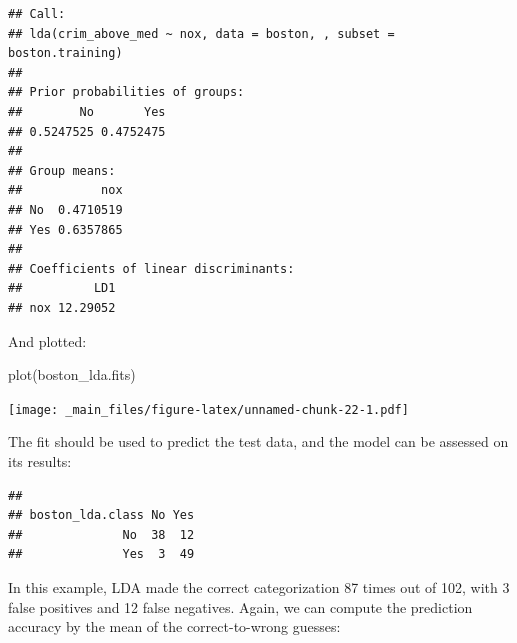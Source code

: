\documentclass[
]{book}
\newenvironment{Shaded}{\begin{snugshade}}{\end{snugshade}}
\newcommand{\FunctionTok}[1]{\textcolor[rgb]{0.00,0.00,0.00}{#1}}
\newcommand{\NormalTok}[1]{#1}
\newcommand{\OtherTok}[1]{\textcolor[rgb]{0.56,0.35,0.01}{#1}}
\newcommand{\SpecialCharTok}[1]{\textcolor[rgb]{0.00,0.00,0.00}{#1}}
\begin{document}
\begin{verbatim}
## Call:
## lda(crim_above_med ~ nox, data = boston, , subset = boston.training)
## 
## Prior probabilities of groups:
##        No       Yes 
## 0.5247525 0.4752475 
## 
## Group means:
##           nox
## No  0.4710519
## Yes 0.6357865
## 
## Coefficients of linear discriminants:
##          LD1
## nox 12.29052
\end{verbatim}

And plotted:

\begin{Shaded}
\begin{Highlighting}[]
\FunctionTok{plot}\NormalTok{(boston\_lda.fits)}
\end{Highlighting}
\end{Shaded}

\texttt{[image: \_main\_files/figure-latex/unnamed-chunk-22-1.pdf]}

The fit should be used to predict the test data, and the model can be assessed on its results:

\begin{Shaded}
\end{Shaded}

\begin{verbatim}
##                 
## boston_lda.class No Yes
##              No  38  12
##              Yes  3  49
\end{verbatim}

In this example, LDA made the correct categorization 87 times out of 102, with 3 false positives and 12 false negatives. Again, we can compute the prediction accuracy by the mean of the correct-to-wrong guesses:

\begin{Shaded}
\end{Shaded}
\end{document}
